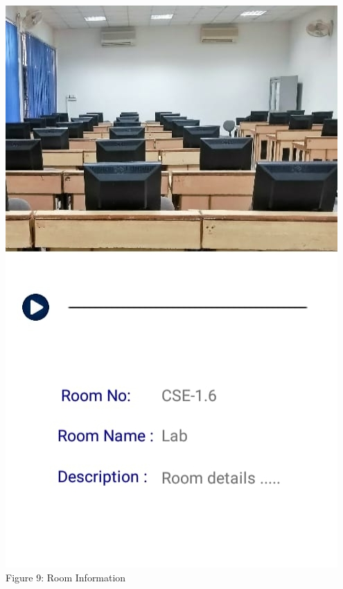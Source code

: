 \documentclass{article}
\begin{document}
\begin{center}
\includegraphics[scale=0.35]{f4}
\\Figure 9: Room Information
\end{center}
\end{document}
